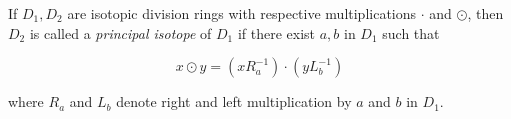 If $D_1, D_2$ are isotopic division rings with respective multiplications $\cdot$ and $\odot$, then $D_2$ is called a {\em principal isotope} of $D_1$ if there exist $a, b$ in $D_1$ such that

$$x \odot y = (x R_a^{-1}) \cdot (y L_b^{-1})$$

where $R_a$ and $L_b$ denote right and left multiplication by $a$ and $b$ in $D_1$.
